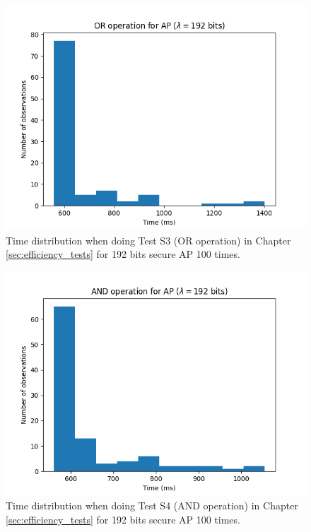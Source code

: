 \begin{figure}[ht]
    \centering
    \includegraphics[width=0.8\linewidth]{data/figures/AP_STD192_OR_operation.png}
    \caption{Time distribution when doing Test S3 (OR operation) in Chapter \ref{sec:efficiency_tests} for 192 bits secure AP 100 times.}
    \label{fig:distr_ap192_or}
\end{figure}

\begin{figure}[ht]
    \centering
    \includegraphics[width=0.8\linewidth]{data/figures/AP_STD192_AND_operation.png}
    \caption{Time distribution when doing Test S4 (AND operation) in Chapter \ref{sec:efficiency_tests} for 192 bits secure AP 100 times.}
    \label{fig:distr_ap192_and}
\end{figure}

